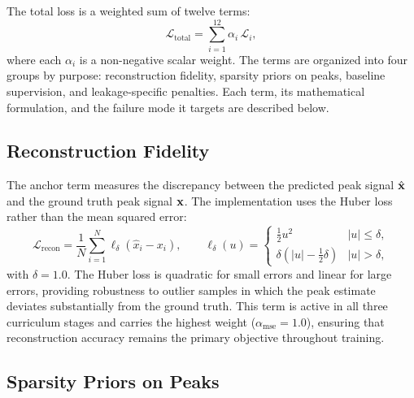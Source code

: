 The total loss is a weighted sum of twelve terms:
\begin{equation}
    \mathcal{L}_{\text{total}} = \sum_{i=1}^{12} \alpha_i \, \mathcal{L}_i,
    \label{eq:total_loss}
\end{equation}
where each $\alpha_i$ is a non-negative scalar weight. The terms are organized into four groups by purpose: reconstruction fidelity, sparsity priors on peaks, baseline supervision, and leakage-specific penalties. Each term, its mathematical formulation, and the failure mode it targets are described below.


\subsection{Reconstruction Fidelity}
\label{sec:method_loss_recon}

The anchor term measures the discrepancy between the predicted peak signal $\hat{\mathbf{x}}$ and the ground truth peak signal $\mathbf{x}$. The implementation uses the Huber loss~\cite{huber1964robust} rather than the mean squared error:
\begin{equation}
    \mathcal{L}_{\text{recon}} = \frac{1}{N} \sum_{i=1}^{N} \ell_\delta(\hat{x}_i - x_i), \qquad
    \ell_\delta(u) =
    \begin{cases}
        \tfrac{1}{2} u^2 & |u| \leq \delta, \\
        \delta(|u| - \tfrac{1}{2}\delta) & |u| > \delta,
    \end{cases}
    \label{eq:huber_loss}
\end{equation}
with $\delta = 1.0$. The Huber loss is quadratic for small errors and linear for large errors, providing robustness to outlier samples in which the peak estimate deviates substantially from the ground truth. This term is active in all three curriculum stages and carries the highest weight ($\alpha_{\text{mse}} = 1.0$), ensuring that reconstruction accuracy remains the primary objective throughout training.


\subsection{Sparsity Priors on Peaks}
\label{sec:method_loss_sparsity}

